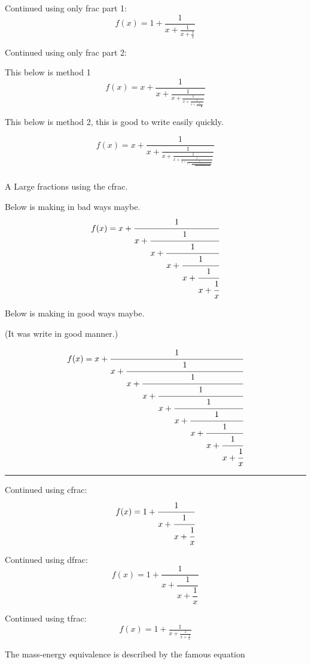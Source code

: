 \documentclass[12pt, letterpaper]{article}
\begin{document}
Continued using only frac part 1:
\[
f(x) = 1 + \frac{1}{x + \frac{1}{x + \frac{1}{x}}}
\]


Continued using only frac part 2:

This below is method  1
\[
    f(x) = x + \frac{1}{x + \frac{1}{x + \frac{1}{x + \frac{1}{x + \frac{1}{x + \frac{1}{x}}}}}}
    \]
    

This below is method  2, this is good to write easily quickly.

\[
f(x) = x + \frac{1}{x + 
         \frac{1}{x + 
         \frac{1}{x + 
         \frac{1}{x + 
         \frac{1}{x + 
         \frac{1}{x + 
         \frac{1}{x + 
         \frac{1}{x + 
         \frac{1}{x + 
         \frac{1}{x + 
         \frac{1}{x + 
         \frac{1}{x + 
         \frac{1}{x + 
         \frac{1}{x + 
         \frac{1}{x
         }}}}}}}}}}}}}}}
\]





\newpage

A Large fractions using the cfrac.

Below is making in bad ways maybe.
\[
    f(x) = x + \cfrac{1}{x + \cfrac{1}{x + \cfrac{1}{x + \cfrac{1}{x + \cfrac{1}{x + \cfrac{1}{x}}}}}}
\]
    
Below is making in good ways maybe.

(It was write in good manner.)

\[
f(x) = x + \cfrac{1}{x + 
          \cfrac{1}{x + 
          \cfrac{1}{x + 
          \cfrac{1}{x + 
          \cfrac{1}{x + 
          \cfrac{1}{x + 
          \cfrac{1}{x + 
          \cfrac{1}{x + 
          \cfrac{1}{x
          }}}}}}}}}
\]


\noindent\rule{\linewidth}{5pt}



Continued using cfrac:
\[
f(x) = 1 + \cfrac{1}{x + \cfrac{1}{x + \cfrac{1}{x}}}
\]


Continued using dfrac:
\[
f(x) = 1 + \dfrac{1}{x + \dfrac{1}{x + \dfrac{1}{x}}}
\]


Continued using tfrac:
\[
f(x) = 1 + \tfrac{1}{x + \tfrac{1}{x + \tfrac{1}{x}}}
\]















\newpage


The mass-energy equivalence is described by the famous equation
\end{document}
